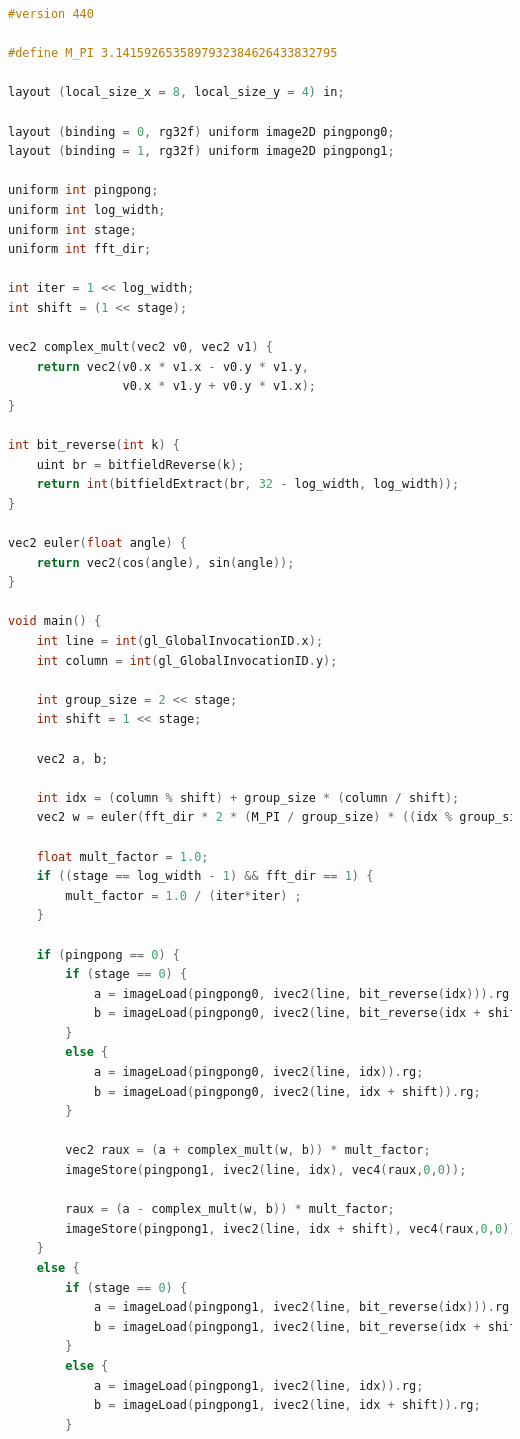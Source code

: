 \documentclass[
  oneside,
  11pt, a4paper,
  footinclude=true,
  headinclude=true,
  cleardoublepage=empty
]{scrbook}
\begin{document}

\begin{lstlisting}[language=C,caption={FFT Cooley-Tukey Vertical stage pass, see \autoref{sec:ct-impl}},label={lst:glsl-ct-vertical}]
#version 440

#define M_PI 3.1415926535897932384626433832795

layout (local_size_x = 8, local_size_y = 4) in;

layout (binding = 0, rg32f) uniform image2D pingpong0;
layout (binding = 1, rg32f) uniform image2D pingpong1;

uniform int pingpong;
uniform int log_width;
uniform int stage;
uniform int fft_dir;

int iter = 1 << log_width;
int shift = (1 << stage);

vec2 complex_mult(vec2 v0, vec2 v1) {
	return vec2(v0.x * v1.x - v0.y * v1.y,
				v0.x * v1.y + v0.y * v1.x);
}

int bit_reverse(int k) {
    uint br = bitfieldReverse(k);
    return int(bitfieldExtract(br, 32 - log_width, log_width));
}

vec2 euler(float angle) {
	return vec2(cos(angle), sin(angle));
}

void main() {
	int line = int(gl_GlobalInvocationID.x);
	int column = int(gl_GlobalInvocationID.y);

	int group_size = 2 << stage;
	int shift = 1 << stage;

	vec2 a, b;

    int idx = (column % shift) + group_size * (column / shift);
    vec2 w = euler(fft_dir * 2 * (M_PI / group_size) * ((idx % group_size) % shift));

    float mult_factor = 1.0;
    if ((stage == log_width - 1) && fft_dir == 1) {
        mult_factor = 1.0 / (iter*iter) ;
    }

    if (pingpong == 0) {
        if (stage == 0) {
            a = imageLoad(pingpong0, ivec2(line, bit_reverse(idx))).rg;
            b = imageLoad(pingpong0, ivec2(line, bit_reverse(idx + shift))).rg;
        }
        else {
            a = imageLoad(pingpong0, ivec2(line, idx)).rg;
            b = imageLoad(pingpong0, ivec2(line, idx + shift)).rg;
        }
        
        vec2 raux = (a + complex_mult(w, b)) * mult_factor;
        imageStore(pingpong1, ivec2(line, idx), vec4(raux,0,0));
            
        raux = (a - complex_mult(w, b)) * mult_factor;
        imageStore(pingpong1, ivec2(line, idx + shift), vec4(raux,0,0));
    }
    else {
        if (stage == 0) {
            a = imageLoad(pingpong1, ivec2(line, bit_reverse(idx))).rg;
            b = imageLoad(pingpong1, ivec2(line, bit_reverse(idx + shift))).rg;
        }
        else {	
            a = imageLoad(pingpong1, ivec2(line, idx)).rg;
            b = imageLoad(pingpong1, ivec2(line, idx + shift)).rg;
        }


\end{lstlisting}
\end{document}
